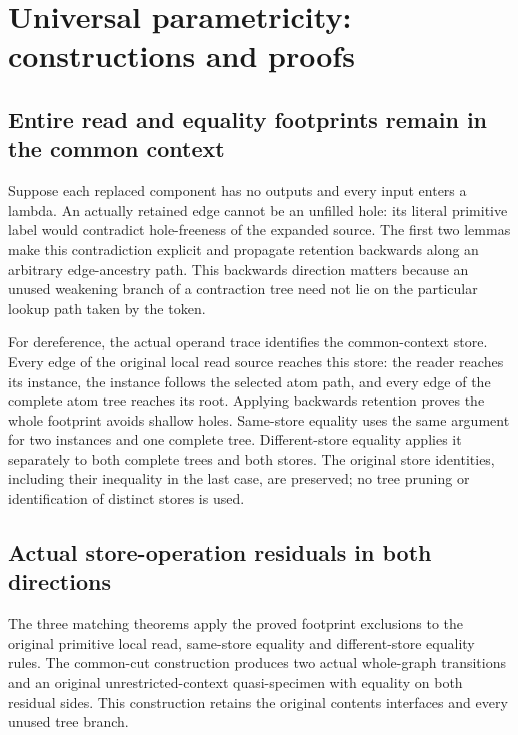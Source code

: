 \clearpage
\section{Universal parametricity: constructions and proofs}
\label{sec:parametricity-universal-concordance}
\subsection{Entire read and equality footprints remain in the common context}
Suppose each replaced component has no outputs and every input enters a lambda. An actually retained edge cannot be an unfilled hole: its literal primitive label would contradict hole-freeness of the expanded source. The first two lemmas make this contradiction explicit and propagate retention backwards along an arbitrary edge-ancestry path. This backwards direction matters because an unused weakening branch of a contraction tree need not lie on the particular lookup path taken by the token.

For dereference, the actual operand trace identifies the common-context store. Every edge of the original local read source reaches this store: the reader reaches its instance, the instance follows the selected atom path, and every edge of the complete atom tree reaches its root. Applying backwards retention proves the whole footprint avoids shallow holes. Same-store equality uses the same argument for two instances and one complete tree. Different-store equality applies it separately to both complete trees and both stores. The original store identities, including their inequality in the last case, are preserved; no tree pruning or identification of distinct stores is used.
\par{}
\par{}

\subsection{Actual store-operation residuals in both directions}
The three matching theorems apply the proved footprint exclusions to the original primitive local read, same-store equality and different-store equality rules. The common-cut construction produces two actual whole-graph transitions and an original unrestricted-context quasi-specimen with equality on both residual sides. This construction retains the original contents interfaces and every unused tree branch.

